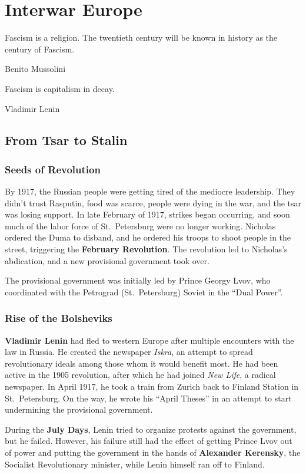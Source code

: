 \chapter{Interwar Europe}

\epigraph{%
  Fascism is a religion. The twentieth century will be known in history as the century of Fascism.
}{Benito Mussolini}

\epigraph{%
  Fascism is capitalism in decay.
}{Vladimir Lenin}

\section{From Tsar to Stalin}

\subsection*{Seeds of Revolution}

By 1917, the Russian people were getting tired of the mediocre leadership.
They didn't trust Rasputin, food was scarce, people were dying in the war,
and the tsar was losing support.
In late February of 1917, strikes began occurring,
and soon much of the labor force of St.\ Petersburg were no longer working.
Nicholas ordered the Duma to disband, and he ordered his troops to shoot people in the street,
triggering the \textbf{February Revolution}.
The revolution led to Nicholas's abdication, and a new provisional government took over.

The provisional government was initially led by Prince Georgy Lvov,
who coordinated with the Petrograd (St.\ Petersburg) Soviet in the ``Dual Power''.

\subsection*{Rise of the Bolsheviks}

\textbf{Vladimir Lenin} had fled to western Europe after multiple encounters with the law in Russia.
He created the newspaper \textit{Iskra},
an attempt to spread revolutionary ideals among those whom it would benefit most.
He had been active in the 1905 revolution,
after which he had joined \textit{New Life}, a radical newspaper.
In April 1917, he took a train from Zurich back to Finland Station in St.\ Petersburg.
On the way,
he wrote his ``April Theses'' in an attempt to start undermining the provisional government.

During the \textbf{July Days},
Lenin tried to organize protests against the government, but he failed.
However, his failure still had the effect of getting Prince Lvov out of power
and putting the government in the hands of \textbf{Alexander Kerensky},
the Socialist Revolutionary minister,
while Lenin himself ran off to Finland.

